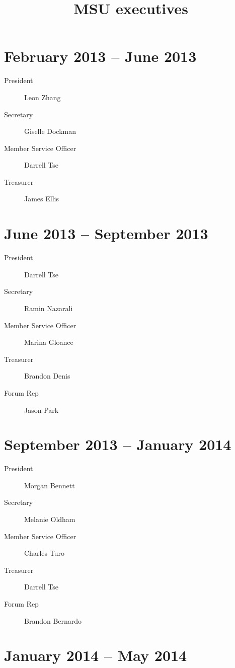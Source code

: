 \documentclass[12pt]{amsart}
\begin{document}
\title{MSU executives}
\maketitle


\section*{February 2013 -- June 2013}

\begin{description}
\item[President] Leon Zhang
\item[Secretary] Giselle Dockman
\item[Member Service Officer] Darrell Tse
\item[Treasurer] James Ellis
\end{description}


\section*{June 2013 -- September 2013}

\begin{description}
\item[President] Darrell Tse
\item[Secretary] Ramin Nazarali
\item[Member Service Officer] Marina Gloance
\item[Treasurer] Brandon Denis
\item[Forum Rep] Jason Park
\end{description}


\section*{September 2013 -- January 2014}

\begin{description}
\item[President] Morgan Bennett
\item[Secretary] Melanie Oldham
\item[Member Service Officer] Charles Turo
\item[Treasurer] Darrell Tse
\item[Forum Rep] Brandon Bernardo
\end{description}


\section*{January 2014 -- May 2014}
\end{document}
